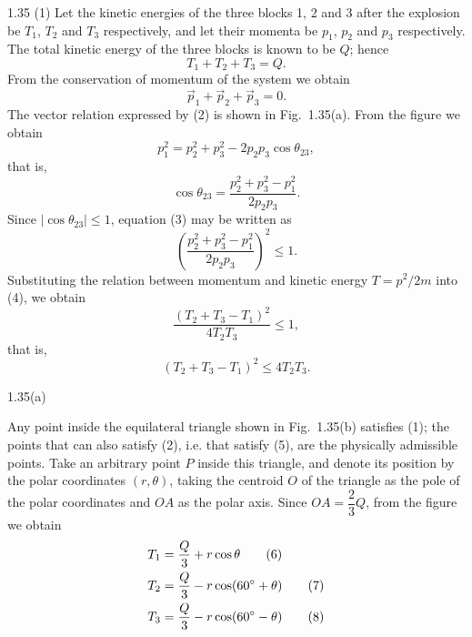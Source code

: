 \begin{solution}{1.35}
(1) Let the kinetic energies of the three blocks 1, 2 and 3 after the explosion be $T_1$, $T_2$ and $T_3$ respectively, and let their momenta be $p_1$, $p_2$ and $p_3$ respectively. The total kinetic energy of the three blocks is known to be $Q$; hence
\begin{equation}
T_1+T_2+T_3=Q. \tag{1}
\end{equation}
From the conservation of momentum of the system we obtain
\begin{equation}
\vec{p}_1+\vec{p}_2+\vec{p}_3=0. \tag{2}
\end{equation}
The vector relation expressed by (2) is shown in Fig.~1.35(a). From the figure we obtain
\[
p_1^2=p_2^2+p_3^2-2p_2p_3\cos\theta_{23},
\]
that is,
\begin{equation}
\cos\theta_{23}=\frac{p_2^2+p_3^2-p_1^2}{2p_2p_3}. \tag{3}
\end{equation}
Since $|\cos\theta_{23}|\le1$, equation (3) may be written as
\begin{equation}
\left(\frac{p_2^2+p_3^2-p_1^2}{2p_2p_3}\right)^2\le1. \tag{4}
\end{equation}
Substituting the relation between momentum and kinetic energy $T=p^2/2m$ into (4), we obtain
\[
\frac{(T_2+T_3-T_1)^2}{4T_2T_3}\le1,
\]
that is,
\begin{equation}
(T_2+T_3-T_1)^2\le4T_2T_3. \tag{5}
\end{equation}

\begin{figbox}{1.35(a)}
\end{figbox}

Any point inside the equilateral triangle shown in Fig.~1.35(b) satisfies (1); the points that can also satisfy (2), i.e. that satisfy (5), are the physically admissible points. Take an arbitrary point $P$ inside this triangle, and denote its position by the polar coordinates $(r,\theta)$, taking the centroid $O$ of the triangle as the pole of the polar coordinates and $OA$ as the polar axis. Since $OA=\dfrac{2}{3}Q$, from the figure we obtain
\begin{align}
T_1 &= \frac{Q}{3}+r\cos\theta \tag{6}\\
T_2 &= \frac{Q}{3}-r\cos(60^{\circ}+\theta) \tag{7}\\
T_3 &= \frac{Q}{3}-r\cos(60^{\circ}-\theta) \tag{8}
\end{align}


\end{solution}
